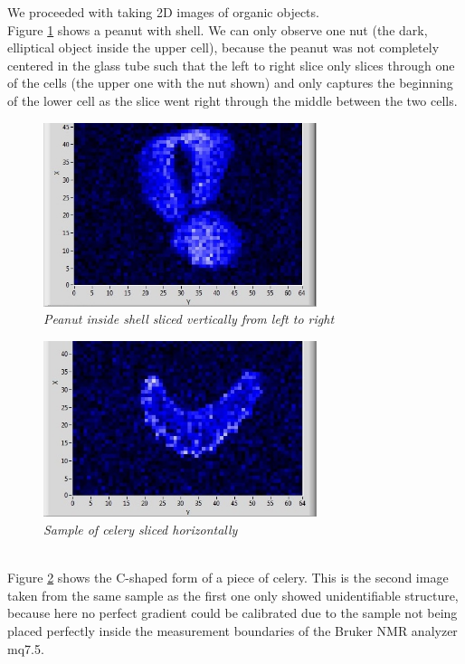 \noindent
We proceeded with taking 2D images of organic objects.\\
Figure \ref{fig:16} shows a peanut with shell. We can only observe one nut (the dark, elliptical object inside the upper cell), because the peanut was not completely centered in the glass tube such that the left to right slice only slices through one of the cells (the upper one with the nut shown) and only captures the beginning of the lower cell as the slice went right through the middle between the two cells.
\begin{figure}[h]
	\includegraphics[width=80mm]{Peanut}
	\centering
	\caption{\itshape Peanut inside shell sliced vertically from left to right}
	\label{fig:16}
\end{figure}
\begin{figure}[h]
	\includegraphics[width=80mm]{Celery}
	\centering
	\caption{\itshape Sample of celery sliced horizontally}
	\label{fig:17}
\end{figure}
\noindent
\\
Figure \ref{fig:17} shows the C-shaped form of a piece of celery. This is the second image taken from the same sample as the first one only showed unidentifiable structure, because here no perfect gradient could be calibrated due to the sample not being placed perfectly inside the measurement boundaries of the Bruker NMR analyzer mq7.5. 

